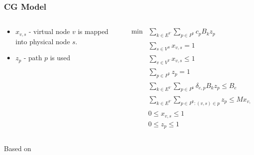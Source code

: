 \documentclass[english]{beamer}
\begin{document}
\begin{frame}
\frametitle{CG Model}
{
\begin{columns}
\begin{column}{0.35\textwidth}
  \begin{itemize}
    \item $x_{v,s}$ - virtual node $v$ is mapped into physical node $s$.
    \item $z_{p}$ - path $p$ is used
  \end{itemize}
\end{column}
\begin{column}{0.45\textwidth}
\tiny
\begin{align}
  \min  & \sum\limits_{k \in E^{V}}\sum\limits_{p \in P^k}  c_{p} B_k z_{p} \nonumber \\
        & \sum\limits_{s \in V^{S}} x_{v,s} = 1                                  & \forall v \in V^{V} \nonumber  \\
        & \sum\limits_{v \in V^{V}} x_{v,s} \leq 1                               & \forall s \in V^{S} \nonumber \\
        & \sum\limits_{p \in P^{k}} z_{p} = 1                                    & \forall k \in E^{V} \nonumber \\
        & \sum\limits_{k \in E^{V}}\sum\limits_{p \in P^{k}} \delta_{e,p} B_{k} z_{p} \leq B_{e} & \forall e \in E^{S} \nonumber \\
        &  \sum\limits_{k \in E^{V}}\sum\limits_{p \in P^k : (v,s) \in p} z_{p} \leq M x_{v,s} & \forall v \in V^{V}, s \in V^{S} \nonumber\\
        & 0 \leq x_{v,s} \leq 1  & \forall v \in V^{V}, s \in V^{S} \nonumber \\
        & 0 \leq z_{p}   \leq 1  & \forall p \in {P} \nonumber
\end{align}
\end{column}
\end{columns}
  Based on \cite{hu:2013}
}
\end{frame}
\end{document}
